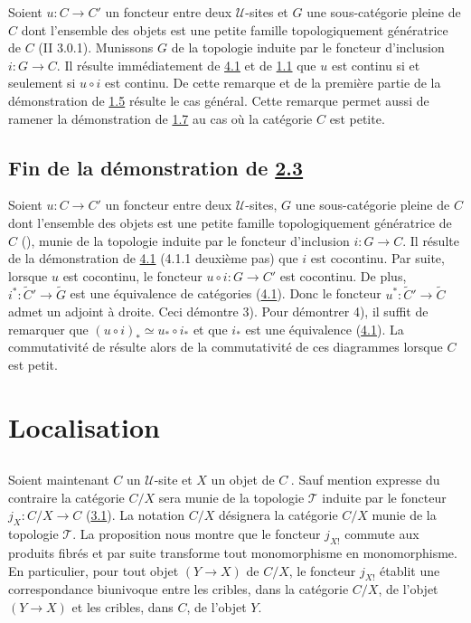 Soient $u:C\rightarrow C'$ un foncteur entre deux $𝒰$-sites
et $G$ une sous-catégorie pleine de $C$ dont l'ensemble des
objets est une petite famille topologiquement génératrice de
$C$ (II 3.0.1). Munissons $G$ de la topologie induite par le
foncteur d'inclusion $i:G\rightarrow C$. Il résulte
immédiatement de \hyperref[III.theo4.1]{4.1} et de \hyperref[III.def1.1]{1.1} que
$u$ est continu si et seulement si $u\circ i$ est continu. De cette
remarque et de la première partie de la démonstration de
\hyperref[III.prop1.5]{1.5} résulte le cas général. Cette remarque
permet aussi de ramener la démonstration de \hyperref[III.prop1.7]{1.7} au
cas où la catégorie $C$ est petite.

\subsection{Fin de la démonstration de \hyperref[III.prop2.3]{2.3}}

Soient $u:C\rightarrow C'$ un foncteur entre deux $𝒰$-sites,
$G$ une sous-catégorie pleine de $C$ dont l'ensemble des objets
est une petite famille topologiquement génératrice de $C$
(), munie de la topologie induite par le foncteur
d'inclusion $i:G\rightarrow C$. Il résulte de la
démonstration de \hyperref[III.theo4.1]{4.1} (4.1.1 deuxième pas) que
$i$ est cocontinu. Par suite, lorsque $u$ est cocontinu, le foncteur
$u\circ i:G\rightarrow C'$ est cocontinu. De plus,
$i^{\ast}:\widetilde{C}'\rightarrow \widetilde{G}$ est une
équivalence de catégories (\hyperref[III.theo4.1]{4.1}). Donc le
foncteur $u^{\ast}:\widetilde{C}'\rightarrow \widetilde{C}$ admet un
adjoint à droite. Ceci démontre 3). Pour démontrer 4), il
suffit de remarquer que $(u\circ i)_{\ast}\simeq u_{\ast}\circ
i_{\ast}$ et que $i_{\ast}$ est une équivalence
(\hyperref[III.theo4.1]{4.1}). La commutativité de 
résulte alors de la commutativité de ces diagrammes lorsque
$C$ est petit.


\section{Localisation}\pageoriginale

\subsection{}
Soient maintenant $C$ un $𝒰$-site et $X$ un objet de
$C^{\widehat{\phantom{,}}}$. Sauf mention expresse du contraire la
catégorie $C/X$ sera munie de la topologie $𝒯$ induite par le
foncteur $j_X:C/X\rightarrow C$ (\hyperref[III.subsec3.1]{3.1}). La notation
$C/X$ désignera la catégorie $C/X$ munie de la topologie $𝒯$. La
proposition  nous montre que le foncteur $j_{X!}$
commute aux produits fibrés et par suite transforme tout
monomorphisme en monomorphisme. En particulier, pour tout objet
$(Y\rightarrow X)$ de $C/X$, le foncteur $j_{X!}$ établit une
correspondance biunivoque entre les cribles, dans la catégorie
$C/X$, de l'objet $(Y\rightarrow X)$ et les cribles, dans $C$, de
l'objet $Y$.

